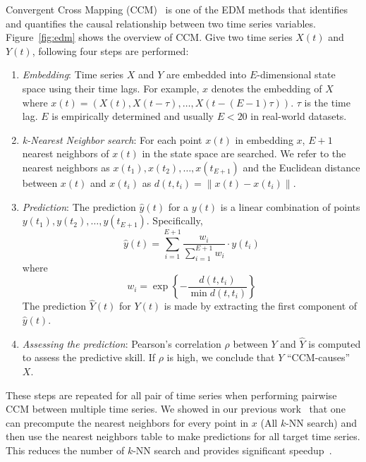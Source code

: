 \documentclass[conference]{IEEEtran}
\begin{document}
Convergent Cross Mapping (CCM)~\cite{Sugihara2012,Natsukawa2017,VanBerkel2020}
is one of the EDM methods that identifies and quantifies the causal
relationship between two time series variables. Figure~\ref{fig:edm} shows the
overview of CCM\@. Give two time series $X(t)$ and $Y(t)$, following four
steps are performed:

\begin{enumerate}
    \item \textit{Embedding}: Time series $X$ and $Y$ are embedded into
        $E$-dimensional state space using their time lags. For example,
        $x$ denotes the embedding of $X$ where $x(t)=\left(X(t), X(t-\tau),
        \dots, X(t-(E-1) \tau)\right)$. $\tau$ is the time lag. $E$ is
        empirically determined and usually $E<20$ in real-world datasets.
    \item \textit{k-Nearest Neighbor search}: For each point $x(t)$ in
        embedding $x$, $E+1$ nearest neighbors of $x(t)$ in the state space
        are searched. We refer to the nearest neighbors as $x(t_1), x(t_2),
        \dots, x(t_{E+1})$ and the Euclidean distance between $x(t)$ and
        $x(t_i)$ as $d(t, t_i) =\lVert x(t) - x(t_i) \rVert$.
    \item \textit{Prediction}: The prediction $\hat{y}(t)$ for a $y(t)$ is a
        linear combination of points $y(t_1), y(t_2), \dots, y(t_{E+1})$.
        Specifically,
        \begin{equation*}
            \hat{y}(t) = \sum^{E+1}_{i=1} \frac{w_i}{\sum^{E+1}_{i=1}{w_i}} \cdot y(t_i)
        \end{equation*}
        where
        \begin{equation*}
            w_i = \exp\left\{ -\frac{d(t, t_i)}{\min{d(t, t_i)}}\right\}
        \end{equation*}
        The prediction $\hat{Y}(t)$ for $Y(t)$ is made by extracting the first
        component of $\hat{y}(t)$.
    \item \textit{Assessing the prediction}: Pearson's correlation $\rho$
        between $Y$ and $\hat{Y}$ is computed to assess the predictive skill.
        If $\rho$ is high, we conclude that $Y$ ``CCM-causes'' $X$.
\end{enumerate}

These steps are repeated for all pair of time series when performing
pairwise CCM between multiple time series. We showed in our previous
work~\cite{mpedm} that one can precompute the nearest neighbors for every
point in $x$ (All $k$-NN search) and then use the nearest neighbors table to
make predictions for all target time series. This reduces the number of $k$-NN
search and provides significant speedup~\cite{mpedm}.
\end{document}
